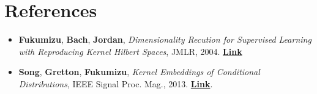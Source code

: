 \section*{References}
\begin{itemize}
	\item \textbf{Fukumizu}, \textbf{Bach}, \textbf{Jordan}, \emph{Dimensionality Recution for Supervised Learning with Reproducing Kernel Hilbert Spaces}, JMLR, 2004. \href{http://www.jmlr.org/papers/volume5/fukumizu04a/fukumizu04a.ps}{\textbf{Link}}
	\item \textbf{Song}, \textbf{Gretton}, \textbf{Fukumizu}, \emph{Kernel Embeddings of Conditional Distributions}, IEEE Signal Proc. Mag., 2013.
	 \href{http://www.gatsby.ucl.ac.uk/~gretton/papers/SonFukGre13.pdf}{\textbf{Link}}.
\end{itemize}

